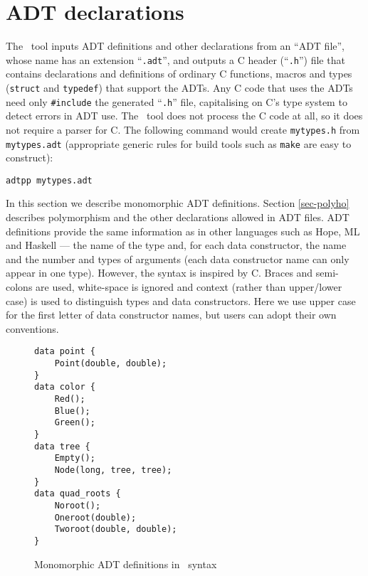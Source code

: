 \section{ADT declarations}
\label{sec-adt}

The \adtpp\ tool inputs ADT definitions and other declarations from an
``ADT file'', whose name has an extension ``\texttt{.adt}'', and outputs a
C header (``\texttt{.h}'') file that contains declarations and definitions
of ordinary C functions, macros and types (\texttt{struct} and \texttt{typedef})
that support the ADTs.
Any C code that uses the ADTs need only
\texttt{\#include} the generated ``\texttt{.h}'' file,
capitalising on C's type system to detect errors in ADT use.
The \adtpp\ tool does not process the C code at all, so it does not
require a parser for C.
The following command would create
\texttt{mytypes.h} from \texttt{mytypes.adt} (appropriate generic rules
for build tools such as \texttt{make} are easy to construct):
\begin{verbatim}
adtpp mytypes.adt
\end{verbatim}

In this section we describe monomorphic ADT
definitions. Section \ref{sec-polyho} describes
polymorphism and the other declarations allowed in ADT files.
ADT definitions provide the
same information as in other languages such as Hope, ML and Haskell --- the
name of the type and, for each data constructor, the name and the number
and types of arguments (each data constructor name can only appear in
one type).  However, the syntax is inspired by C. Braces and
semi-colons are used, white-space is ignored and context (rather than
upper/lower case) is used to distinguish types and data constructors.
Here we use upper case for the first letter of data constructor names,
but users can adopt their own conventions.


\begin{figure}[!ht]
\begin{verbatim}
data point {
    Point(double, double);
}
data color {
    Red();
    Blue();
    Green();
}
data tree {
    Empty();
    Node(long, tree, tree);
}
data quad_roots {
    Noroot();
    Oneroot(double);
    Tworoot(double, double);
}
\end{verbatim}
\caption{Monomorphic ADT definitions in \adtpp\ syntax}
\label{fig:decl}
\end{figure}

